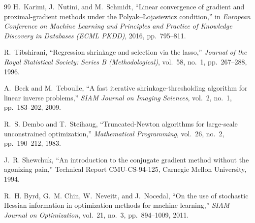 \documentclass[a4paper,12pt]{article}
\numberwithin{equation}{section}
\numberwithin{figure}{section}
\numberwithin{table}{section}
\begin{document}
\begin{thebibliography}{99}
H.~Karimi, J.~Nutini, and M.~Schmidt,
``Linear convergence of gradient and proximal-gradient methods under the
Polyak--{\L}ojasiewicz condition,''
in \textit{European Conference on Machine Learning and Principles and
Practice of Knowledge Discovery in Databases (ECML PKDD)}, 2016,
pp.~795--811.

R.~Tibshirani,
``Regression shrinkage and selection via the lasso,''
\textit{Journal of the Royal Statistical Society: Series B (Methodological)},
vol.~58, no.~1, pp.~267--288, 1996.

A.~Beck and M.~Teboulle,
``A fast iterative shrinkage-thresholding algorithm for linear inverse
problems,''
\textit{SIAM Journal on Imaging Sciences}, vol.~2, no.~1, pp.~183--202,
2009.

R.~S. Dembo and T.~Steihaug,
``Truncated-Newton algorithms for large-scale unconstrained optimization,''
\textit{Mathematical Programming}, vol.~26, no.~2, pp.~190--212, 1983.

J.~R. Shewchuk,
``An introduction to the conjugate gradient method without the agonizing
pain,''
Technical Report CMU-CS-94-125, Carnegie Mellon University, 1994.

R.~H. Byrd, G.~M. Chin, W.~Neveitt, and J.~Nocedal,
``On the use of stochastic Hessian information in optimization methods for
machine learning,''
\textit{SIAM Journal on Optimization}, vol.~21, no.~3, pp.~894--1009, 2011.

\end{thebibliography}
\end{document}
